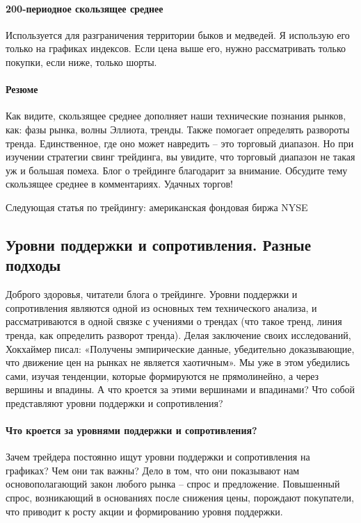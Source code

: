 \documentclass[a5paper]{article}
\begin{document}
\paragraph{200-периодное скользящее среднее}

Используется для разграничения территории быков и медведей. Я
использую его только на графиках индексов. Если цена выше его, нужно
рассматривать только покупки, если ниже, только шорты.

\paragraph{Резюме}

Как видите, скользящее среднее дополняет наши технические познания рынков, как: фазы рынка, волны Эллиота, тренды. Также помогает определять развороты тренда. Единственное, где оно может навредить – это торговый диапазон. Но при изучении стратегии свинг трейдинга, вы увидите, что торговый диапазон не такая уж и большая помеха. Блог о трейдинге благодарит за внимание. Обсудите тему скользящее среднее в комментариях. Удачных торгов!

Следующая статья по трейдингу: американская фондовая биржа NYSE

\subsection{Уровни поддержки и сопротивления. Разные подходы}

Доброго здоровья, читатели блога о трейдинге. Уровни поддержки и
сопротивления являются одной из основных тем технического анализа, и
рассматриваются в одной связке с учениями о трендах (что такое тренд,
линия тренда, как определить разворот тренда). Делая заключение своих
исследований, Хокхаймер писал: «Получены эмпирические данные,
убедительно доказывающие, что движение цен на рынках не является
хаотичным». Мы уже в этом убедились сами, изучая тенденции, которые
формируются не прямолинейно, а через вершины и впадины. А что кроется
за этими вершинами и впадинами? Что собой представляют уровни
поддержки и сопротивления?

\paragraph{Что кроется за уровнями поддержки и сопротивления?  }

Зачем трейдера постоянно ищут уровни поддержки и сопротивления на графиках? Чем они так важны?  Дело в том, что они показывают нам основополагающий закон любого рынка – спрос и предложение. Повышенный спрос, возникающий в основаниях после снижения цены, порождают покупатели, что приводит к росту акции и формированию уровня поддержки.
\end{document}
